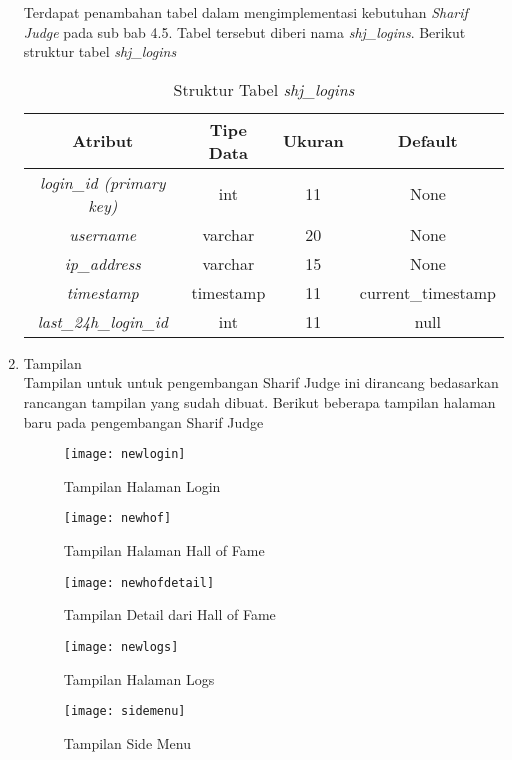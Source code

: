 \begin{enumerate}
	Terdapat penambahan tabel dalam mengimplementasi kebutuhan \textit{Sharif Judge} pada sub bab 4.5. Tabel tersebut diberi nama \textit{shj\_logins}. Berikut struktur tabel \textit{shj\_logins}
	\begin{table}[H] %
		\centering 
		\caption{Struktur Tabel \textit{shj\_logins}}
		\label{tab:tabellogsfix}
		\begin{tabular}{|c|c|c|c|}
			\hline
			\textbf{Atribut} & \textbf{Tipe Data} & \textbf{Ukuran}  & \textbf{Default} \\
			\hline
			\textit{login\_id (primary key)} & int & 11  & None \\
			\hline
			\textit{username} & varchar & 20  & None \\
			\hline
			\textit{ip\_address} & varchar & 15  & None \\
			\hline
			\textit{timestamp} & timestamp & 11  & current\_timestamp \\
			\hline
			\textit{last\_24h\_login\_id}	 & int & 11  & null \\
			\hline
		\end{tabular}
	\end{table}

	\item Tampilan \\
	Tampilan untuk untuk pengembangan Sharif Judge ini dirancang bedasarkan rancangan tampilan yang sudah dibuat. Berikut beberapa tampilan halaman baru pada pengembangan Sharif Judge
	
	\begin{figure}[H]
		\centering  
		\texttt{[image: newlogin]}  
		\caption[Tampilan Halaman Login]{Tampilan Halaman Login} 
		\label{fig:newlogin} 
	\end{figure}
	
	\begin{figure}[H]
		\centering  
		\texttt{[image: newhof]}  
		\caption[Tampilan Halaman Hall of Fame]{Tampilan Halaman Hall of Fame} 
		\label{fig:newhof} 
	\end{figure}

	\begin{figure}[H]
		\centering  
		\texttt{[image: newhofdetail]}  
		\caption[Tampilan Detail dari Hall of Fame]{Tampilan Detail dari Hall of Fame} 
		\label{fig:newhofdetail} 
	\end{figure}

	\begin{figure}[H]
		\centering  
		\texttt{[image: newlogs]}  
		\caption[Tampilan Halaman Logs]{Tampilan Halaman Logs} 
		\label{fig:newlogs} 
	\end{figure}

	\begin{figure}[H]
		\centering  
		\texttt{[image: sidemenu]}  
		\caption[Tampilan Side Menu]{Tampilan Side Menu} 
		\label{fig:sidemenu} 
	\end{figure}
\end{enumerate}

